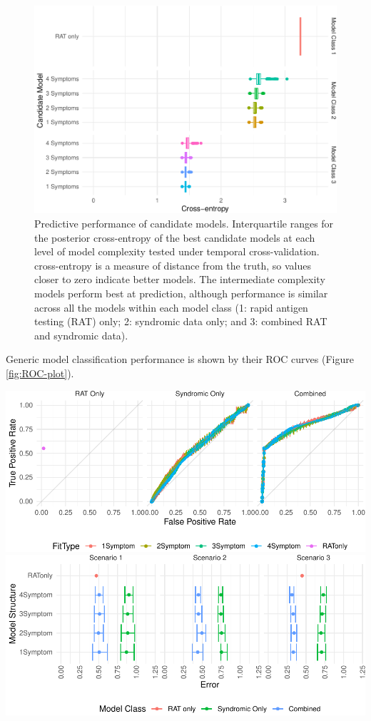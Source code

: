 \documentclass[]{elsarticle} %
\begin{document}
\begin{figure}
\centering
\includegraphics{0501_MainText_files/figure-latex/pred-perf-1.pdf}
\caption{\label{fig:pred-perf}Predictive performance of candidate models. Interquartile ranges for the posterior cross-entropy of the best candidate models at each level of model complexity tested under temporal cross-validation. cross-entropy is a measure of distance from the truth, so values closer to zero indicate better models. The intermediate complexity models perform best at prediction, although performance is similar across all the models within each model class (1: rapid antigen testing (RAT) only; 2: syndromic data only; and 3: combined RAT and syndromic data).}
\end{figure}

Generic model classification performance is shown by their ROC curves (Figure \ref{fig:ROC-plot}).

\includegraphics{0501_MainText_files/figure-latex/ROC-plot-1.pdf}
\includegraphics{0501_MainText_files/figure-latex/scenario-plot-1.pdf}
\end{document}
